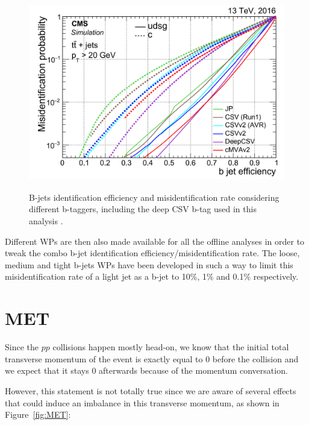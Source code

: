 \documentclass[a4paper, 10pt, openright]{report}
\begin{document}
\begin{figure}[htbp]
\begin{center}
\includegraphics[width=13cm, height=8.5cm]{figs/CMSBTag.png}
\caption{B-jets identification efficiency and misidentification rate considering different b-taggers, including the deep CSV b-tag used in this analysis \cite{BTag}.}
\label{fig:CMSBTag}
\end{center}
\end{figure}

Different \acp{WP} are then also made available for all the offline analyses in order to tweak the combo b-jet identification efficiency/misidentification rate. The loose, medium and tight b-jets \acp{WP} have been developed in such a way to limit this misidentification rate of a light jet as a b-jet to 10\%, 1\% and 0.1\% respectively.

\section{\acf{MET}} \label{section:RecoMET}

Since the $pp$ collisions happen mostly head-on, we know that the initial total transverse momentum of the event is exactly equal to 0 before the collision and we expect that it stays 0 afterwards because of the momentum conversation. 

However, this statement is not totally true since we are aware of several effects that could induce an imbalance in this transverse momentum, as shown in Figure~\ref{fig:MET}:
\end{document}
